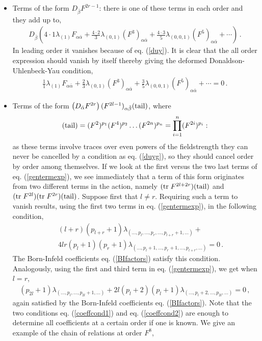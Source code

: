 \documentclass[a4paper,12pt,oneside]{article}
\newcommand{\tr}{\mbox{${\rm tr \;}$}}
\newcommand{\tail}{\mbox{$({\rm tail})$}}
\begin{document}
\begin{itemize}
\item Terms of the form $D_{\bar{\beta}} F^{2r-1}$: there is one of 
these terms in each order and they add up to,
\begin{eqnarray}
D_{\bar{\beta}} \left( 4 \cdot 1 \lambda_{(1)} F_{\alpha \bar\alpha } + 
\frac{4 \cdot 2}{3}\lambda_{(0,1)} (F^3)_{\alpha \bar\alpha } + 
\frac{4 \cdot 3}{5} \lambda_{(0,0,1)} 
(F^5 )_{\alpha \bar\alpha }
+ \cdots \right) \, .
\end{eqnarray}
In leading order it vanishes because of eq. (\ref{duy}). 
It is clear that the all order expression should vanish by itself 
thereby giving the deformed Donaldson-Uhlenbeck-Yau condition,
\begin{eqnarray}
\frac 1 1 \lambda_{(1)} F_{\alpha \bar\alpha } + 
\frac{ 2}{3}\lambda_{(0,1)} (F^3)_{\alpha \bar\alpha } + 
\frac{ 3}{5} \lambda_{(0,0,1)} 
(F^5 )_{\alpha \bar\alpha }
+ \cdots =0\, .  \label{duyg}
\end{eqnarray}
\item Terms of the form $\left( D_{\bar{\alpha}} F^{2r} \right) 
(F^{2l-1})_{\alpha\bar{\beta}} \tail$, where
\begin{eqnarray}
\tail= (F^2)^{p_1} (F^4)^{p_2}\ldots (F^{2n})^{p_n}=\prod_{i=1}^n(F^{2i})^{p_i}:
\end{eqnarray} 
as these terms involve traces over even powers of the fieldstrength they 
can never be cancelled by a condition as eq. (\ref{duyg}), so they should 
cancel order by order among themselves.
If we look at the first versus the two last terms of 
eq. (\ref{gentermexp}), we see immediately that a term of this form originates
from two different terms in the action, namely $(\tr F^{2l+2r}) \tail$ and
$(\tr F^{2l}) (\tr F^{2r})\tail$.  Suppose first that $l \neq r$.
Requiring such a term to vanish results, using the first two terms
in eq. (\ref{gentermexp}), in the following condition,
\begin{eqnarray}
\label{coeffcond1}
&&(l+r)(p_{l+r}+1) \lambda_{(\ldots,p_l,\ldots,p_r,\ldots,p_{l+r}+1,
\ldots)} +\nonumber\\
&&4 l r(p_l+1)(p_r+1) \lambda_{(\ldots,p_l+1,\ldots,p_r+1,
\ldots,p_{l+r},\ldots)} =0 \, .
\end{eqnarray}
The Born-Infeld coefficients eq. (\ref{BIfactors}) satisfy this condition.
Analogously, using the first and third term in eq. (\ref{gentermexp}), 
we get when $l = r$,
\begin{eqnarray}
\label{coeffcond2}
(p_{2l}+1) \lambda_{(\ldots,p_l,\ldots,p_{2l}+1,\ldots)}+
2 l (p_l+2)(p_l+1) \lambda_{(\ldots,p_l+2,\ldots,p_{2l},\ldots)} =0 \, ,
\end{eqnarray}
again satisfied by the Born-Infeld coefficients eq. (\ref{BIfactors}).
Note that the two conditions eq. (\ref{coeffcond1}) and eq. (\ref{coeffcond2}) 
are enough to determine all coefficients at a
certain order if one is known.  
We give an example of the chain of relations at order $F^{8}$,


\end{itemize}
\end{document}
